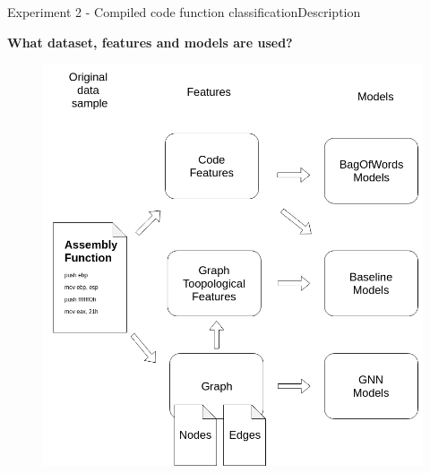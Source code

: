 \documentclass[xcolor=table]{beamer}
\begin{document}
\begin{frame}{Experiment 2 - Compiled code function classification}{Description}

\textbf{What dataset, features and models are used?}


\begin{figure}
    \includegraphics[scale=0.22]{./img/Features_and_models_diagram.png}
\end{figure} 








\end{frame}
\end{document}
